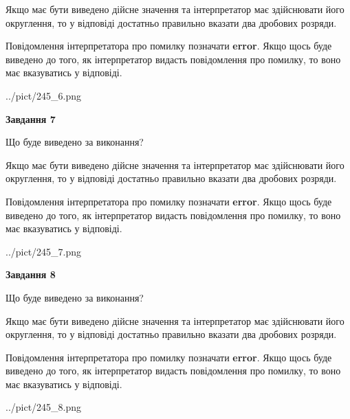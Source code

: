 \documentclass[12pt, ukrainian]{article}
\begin{document}
{\begin {Large}
Якщо має бути виведено дійсне значення та інтерпретатор має здійснювати його округлення, 
то у відповіді достатньо правильно вказати два дробових розряди.

Повідомлення інтерпретатора про помилку позначати \textbf{error}.
Якщо щось буде виведено до того, як інтерпретатор видасть повідомлення про помилку, 
то воно має вказуватись у відповіді. \par

\begin{center}
	{../pict/245_6.png}
\end{center}
\newpage

{\begin {center}\textbf{Завдання 7}\end {center}}\par
Що буде виведено за виконання? \par

Якщо має бути виведено дійсне значення та інтерпретатор має здійснювати його округлення, 
то у відповіді достатньо правильно вказати два дробових розряди.

Повідомлення інтерпретатора про помилку позначати \textbf{error}.
Якщо щось буде виведено до того, як інтерпретатор видасть повідомлення про помилку, 
то воно має вказуватись у відповіді. \par

\begin{center}
	{../pict/245_7.png}
\end{center}
\newpage

{\begin {center}\textbf{Завдання 8}\end {center}}\par
Що буде виведено за виконання? \par

Якщо має бути виведено дійсне значення та інтерпретатор має здійснювати його округлення, 
то у відповіді достатньо правильно вказати два дробових розряди.

Повідомлення інтерпретатора про помилку позначати \textbf{error}.
Якщо щось буде виведено до того, як інтерпретатор видасть повідомлення про помилку, 
то воно має вказуватись у відповіді. \par

\begin{center}
	{../pict/245_8.png}
\end{center}
\newpage


\end{Large}}
\end{document}
